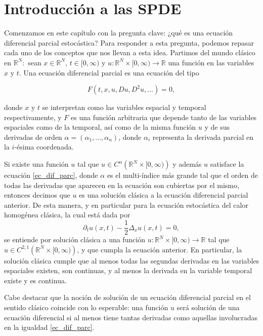 \documentclass[letterpaper,twoside,12pt]{book}
\newcommand{\R}{\mathbb{R}}
\newcommand{\1}{\mathds{1}}
\renewcommand{\to}{\rightarrow}
\theoremstyle{definition}
\theoremstyle{definition}
\theoremstyle{remark}
\theoremstyle{definition}
\theoremstyle{definition}
\theoremstyle{definition}
\theoremstyle{definition}
\theoremstyle{definition}
\begin{document}
\section{Introducción a las SPDE}

Comenzamos en este capítulo con la pregunta clave: ¿qué es una ecuación diferencial parcial estocástica? Para responder a esta pregunta, podemos repasar cada uno de los conceptos que nos llevan a esta idea. Partimos del mundo clásico en $\R^{N}:$ sean $x\in \R^{N}$, $t\in [0,\infty)$ y $u:\R^{N}\times[0,\infty)\to \R$ una función en las variables $x$ y $t$. Una ecuación diferencial parcial es una ecuación del tipo 

\begin{equation}\label{ec_dif_parc}
    F(t,x,u,Du,D^2u,...)=0,    
\end{equation}

donde $x$ y $t$ se interpretan como las variables espacial y temporal respectivamente, y $F$ es una función arbitraria que depende tanto de las variables espaciales como de la temporal, así como de la misma función $u$ y de sus derivadas de orden $\alpha=(\alpha_1,...,\alpha_n)$, donde $\alpha_i$ representa la derivada parcial en la $i$-ésima coordenada.

Si existe una función $u$ tal que $u\in C^{\alpha}\left(\R^{N}\times [0,\infty)\right)$ y además $u$ satisface la ecuación \eqref{ec_dif_parc}, donde $\alpha$ es el multi-índice más grande tal que el orden de todas las derivadas que aparecen en la ecuación son cubiertas por el mismo, entonces decimos que $u$ es una solución clásica a la ecuación diferencial parcial anterior. De esta manera, y en particular para la ecuación estocástica del calor homogénea clásica, la cual está dada por 
   \begin{equation*}
      \partial_tu(x,t)-\frac{1}{2}\Delta_x u(x,t)=0,
   \end{equation*}
se entiende por solución clásica a una función $u:\R^{N}\times[0,\infty)\to \R$ tal que $u\in C^{2,1}\left(\R^{N}\times [0,\infty)\right)$, y que cumpla la ecuación anterior. En particular, la solución clásica cumple que al menos todas las segundas derivadas en las variables espaciales existen, son continuas, y al menos la derivada en la variable temporal existe y es continua.

Cabe destacar que la noción de solución de un ecuación diferencial parcial en el sentido clásico coincide con lo esperable: una función $u$ será solución de una ecuación diferencial si al menos tiene tantas derivadas como aquellas involucradas en la igualdad \eqref{ec_dif_parc}.
\end{document}
